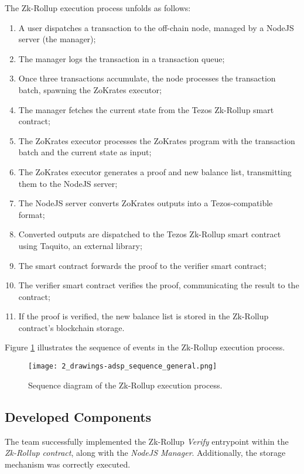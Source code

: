 The Zk-Rollup execution process unfolds as follows:
\begin{enumerate}
    \item A user dispatches a transaction to the off-chain node, managed by a NodeJS server (the manager);
    \item The manager logs the transaction in a transaction queue;
    \item Once three transactions accumulate, the node processes the transaction batch, spawning the ZoKrates executor;
    \item The manager fetches the current state from the Tezos Zk-Rollup smart contract;
    \item The ZoKrates executor processes the ZoKrates program with the transaction batch and the current state as input;
    \item The ZoKrates executor generates a proof and new balance list, transmitting them to the NodeJS server;
    \item The NodeJS server converts ZoKrates outputs into a Tezos-compatible format;
    \item Converted outputs are dispatched to the Tezos Zk-Rollup smart contract using Taquito, an external library;
    \item The smart contract forwards the proof to the verifier smart contract;
    \item The verifier smart contract verifies the proof, communicating the result to the contract;
    \item If the proof is verified, the new balance list is stored in the Zk-Rollup contract's blockchain storage.
\end{enumerate}

Figure \ref{fig:2_drawings-adsp_sequence_general.png} illustrates the sequence of events in the Zk-Rollup execution process.

\begin{figure}[ht]
  \centering
  \texttt{[image: 2\_drawings-adsp\_sequence\_general.png]}
  \caption[Scaling Solutions]{Sequence diagram of the Zk-Rollup execution process.}  
  \label{fig:2_drawings-adsp_sequence_general.png}
\end{figure} 

\subsection{Developed Components}
The team successfully implemented the Zk-Rollup \textit{Verify} entrypoint within the \textit{Zk-Rollup contract}, along with the \textit{NodeJS Manager}. Additionally, the storage mechanism was correctly executed.

